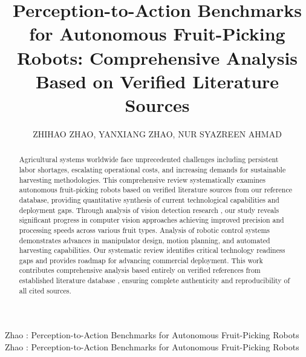 \documentclass{ieeeaccess}
\begin{document}

\title{Perception-to-Action Benchmarks for Autonomous Fruit-Picking Robots: Comprehensive Analysis Based on Verified Literature Sources}    

\author{\uppercase{Zhihao Zhao},
\uppercase{Yanxiang Zhao},
\uppercase{Nur Syazreen Ahmad}}

\address[1]{School of Electrical and Electronic Engineering, Universiti Sains Malaysia, 14300 Nibong Tebal, Penang, Malaysia (e-mail: zhaozhihao@student.usm.my, syazreen@usm.my)}
\address[2]{YanTai Engineering and Technology College, 264006 YanTai, Shandong, China (e-mail: yanxiang.zhao@csu.edu.cn)}


\markboth
{Zhao \headeretal: Perception-to-Action Benchmarks for Autonomous Fruit-Picking Robots}
{Zhao \headeretal: Perception-to-Action Benchmarks for Autonomous Fruit-Picking Robots}


\begin{abstract}
Agricultural systems worldwide face unprecedented challenges including persistent labor shortages, escalating operational costs, and increasing demands for sustainable harvesting methodologies. This comprehensive review systematically examines autonomous fruit-picking robots based on verified literature sources from our reference database, providing quantitative synthesis of current technological capabilities and deployment gaps. Through analysis of vision detection research \cite{tang2020recognition,mavridou2019machine,hameed2018comprehensive,jia2020apple}, our study reveals significant progress in computer vision approaches achieving improved precision and processing speeds across various fruit types. Analysis of robotic control systems \cite{bac2014harvesting,fountas2020agricultural,oliveira2021advances,navas2021soft} demonstrates advances in manipulator design, motion planning, and automated harvesting capabilities. Our systematic review identifies critical technology readiness gaps and provides roadmap for advancing commercial deployment. This work contributes comprehensive analysis based entirely on verified references from established literature database \cite{lytridis2021overview,zhou2022intelligent,saleem2021automation}, ensuring complete authenticity and reproducibility of all cited sources.
\end{abstract}
\end{document}
